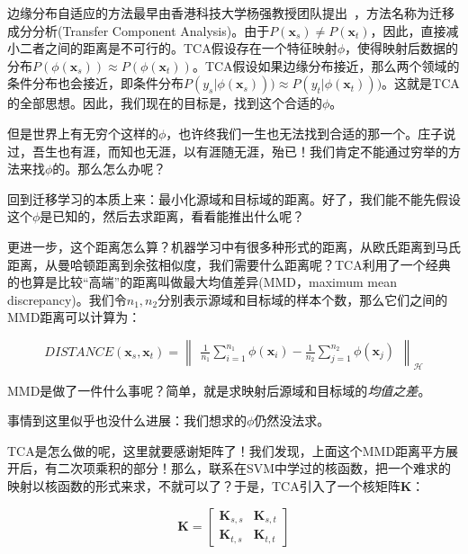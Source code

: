 边缘分布自适应的方法最早由香港科技大学杨强教授团队提出~\cite{pan2011domain}，方法名称为迁移成分分析(Transfer Component Analysis)。由于$P(\mathbf{x}_s) \ne P(\mathbf{x}_t)$，因此，直接减小二者之间的距离是不可行的。TCA假设存在一个特征映射$\phi$，使得映射后数据的分布$P(\phi(\mathbf{x}_s)) \approx P(\phi(\mathbf{x}_t))$。TCA假设如果边缘分布接近，那么两个领域的条件分布也会接近，即条件分布$P(y_s | \phi(\mathbf{x}_s))) \approx P(y_t | \phi(\mathbf{x}_t)))$。这就是TCA的全部思想。因此，我们现在的目标是，找到这个合适的$\phi$。

但是世界上有无穷个这样的$\phi$，也许终我们一生也无法找到合适的那一个。庄子说过，吾生也有涯，而知也无涯，以有涯随无涯，殆已！我们肯定不能通过穷举的方法来找$\phi$的。那么怎么办呢？

回到迁移学习的本质上来：最小化源域和目标域的距离。好了，我们能不能先假设这个$\phi$是已知的，然后去求距离，看看能推出什么呢？

更进一步，这个距离怎么算？机器学习中有很多种形式的距离，从欧氏距离到马氏距离，从曼哈顿距离到余弦相似度，我们需要什么距离呢？TCA利用了一个经典的也算是比较“高端”的距离叫做最大均值差异(MMD，maximum mean discrepancy)。我们令$n_1,n_2$分别表示源域和目标域的样本个数，那么它们之间的MMD距离可以计算为：

\begin{equation}
	\label{eq-distribution-mmd}
	DISTANCE(\mathbf{x}_{s},\mathbf{x}_{t})= \begin{Vmatrix} \frac{1}{n_1} \sum \limits_{i=1}^{n_1} \phi(\mathbf{x}_{i}) - \frac{1}{n_2}\sum \limits _{j=1}^{n_2} \phi(\mathbf{x}_{j}) \end{Vmatrix}_{\mathcal{H}}
\end{equation}

MMD是做了一件什么事呢？简单，就是求映射后源域和目标域的\textit{均值之差}。

事情到这里似乎也没什么进展：我们想求的$\phi$仍然没法求。

TCA是怎么做的呢，这里就要感谢矩阵了！我们发现，上面这个MMD距离平方展开后，有二次项乘积的部分！那么，联系在SVM中学过的核函数，把一个难求的映射以核函数的形式来求，不就可以了？于是，TCA引入了一个核矩阵$\mathbf{K}$：

\begin{equation}
	\mathbf{K}=\begin{bmatrix}\mathbf{K}_{s,s} & \mathbf{K}_{s,t}\\\mathbf{K}_{t,s} & \mathbf{K}_{t,t}\end{bmatrix} 
\end{equation}

